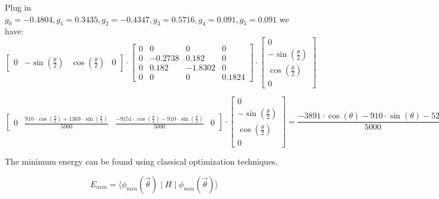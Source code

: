 \documentclass{article}
\begin{document}
\begin{itemize}
    Plug in  \(g_0 = -0.4804, g_1 = 0.3435, g_2 = -0.4347, g_3 = 0.5716, g_4 = 0.091, g_5 = 0.091\) we have: 
    \[
        \begin{bmatrix}
            0 & -\sin(\frac{\theta}{2}) & \cos(\frac{\theta}{2}) & 0
        \end{bmatrix}
        \cdot
        \begin{bmatrix}
            0 & 0 & 0 & 0\\
            0 & -0.2738 & 0.182 & 0\\
            0 & 0.182 & -1.8302 & 0 \\
            0 & 0 & 0 & 0.1824 
        \end{bmatrix}
        \cdot
        \begin{bmatrix}
            0 \\
            - \sin(\frac{\theta}{2}) \\
            \cos(\frac{\theta}{2}) \\
            0
        \end{bmatrix}
    \]

    \[
        \begin{bmatrix}
        0 & \frac{910 \cdot \cos\left(\frac{\theta}{2}\right)+1369 \cdot \sin\left(\frac{\theta}{2}\right)}{5000} & \frac{-9151 \cdot \cos\left(\frac{\theta}{2}\right)-910 \cdot \sin\left(\frac{\theta}{2}\right)}{5000} & 0
        \end{bmatrix}
        \cdot
        \begin{bmatrix}
            0 \\
            - \sin(\frac{\theta}{2}) \\
            \cos(\frac{\theta}{2}) \\
            0
        \end{bmatrix}
        =  \frac{-3891 \cdot \cos\left(\theta\right)-910 \cdot \sin\left(\theta\right)-5260}{5000}
    \]
    
    The minimum energy can be found using classical optimization techniques.

    \[E_{min} = \langle \phi_{min}(\vec{\theta}) \mid H \mid \phi_{min}(\vec{\theta}) \rangle\]
\end{itemize}
\end{document}
